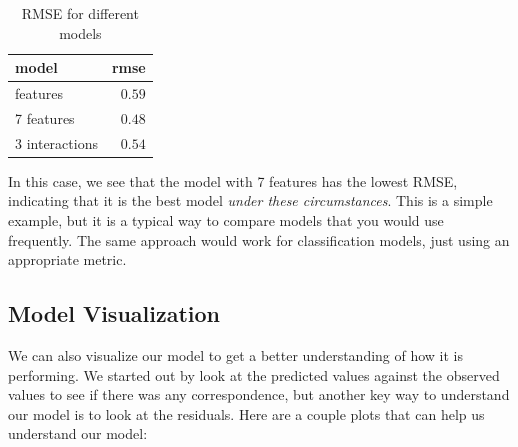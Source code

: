 \documentclass[
  letterpaper,
]{krantz}
\begin{document}
\begin{longtable}{lr}

\caption{\label{tbl-regression-compare}RMSE for different models}

\tabularnewline

\toprule
model & rmse \\ 
\midrule\addlinespace[2.5pt]
3 features & \textcolor[HTML]{404040}{$0.59$} \\ 
7 features & \textcolor[HTML]{404040}{$0.48$} \\ 
3 interactions & \textcolor[HTML]{404040}{$0.54$} \\ 
\bottomrule

\end{longtable}

In this case, we see that the model with 7 features has the lowest RMSE,
indicating that it is the best model \emph{under these circumstances}.
This is a simple example, but it is a typical way to compare models that
you would use frequently. The same approach would work for
classification models, just using an appropriate metric.

\subsection{Model Visualization}\label{model-visualization}

We can also visualize our model to get a better understanding of how it
is performing. We started out by look at the predicted values against
the observed values to see if there was any correspondence, but another
key way to understand our model is to look at the residuals. Here are a
couple plots that can help us understand our model:
\end{document}

